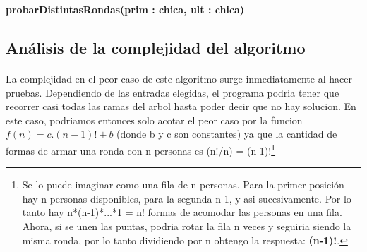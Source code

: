 \incmargin{1em}
\linesnumbered
{}

\textbf{probarDistintasRondas(prim : chica, ult : chica)}\\
	\begin{algorithm}[H]
		\BlankLine


  \end{algorithm}



\subsection{Análisis de la complejidad del algoritmo}
\label{complejidadej2}

\paragraph{}
La complejidad en el peor caso de este algoritmo surge inmediatamente al hacer pruebas. Dependiendo de las entradas elegidas, el programa podria tener que 
recorrer casi todas las ramas del arbol hasta poder decir que no hay solucion. En este caso, podriamos entonces solo acotar el peor caso por la funcion $f(n) = c.(n-1)! + b$ 
(donde b y c son constantes) ya que la cantidad de formas de armar una ronda con n personas es (n!/n) = (n-1)!\footnote{Se lo puede imaginar como una fila de n personas. Para la primer posición hay n personas disponibles, para la segunda n-1, y asi sucesivamente. Por lo tanto hay n*(n-1)*...*1 = n! formas de acomodar las personas en una fila. Ahora, si se unen las puntas, podria rotar la fila n veces y seguiria siendo la misma ronda, por lo tanto dividiendo por n obtengo la respuesta: \textbf{(n-1)!}.} 

